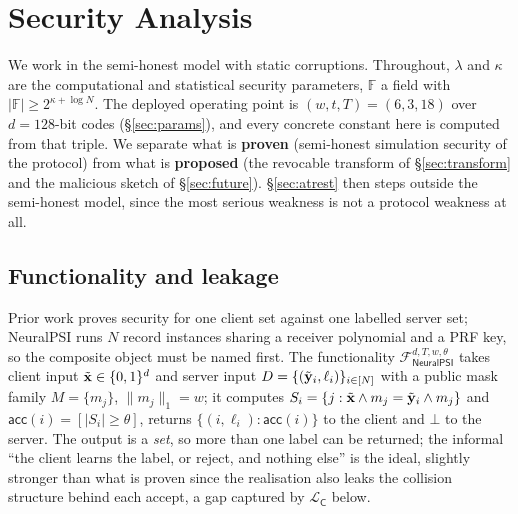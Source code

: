 \section{Security Analysis}
\label{sec:security}

We work in the semi-honest model with static corruptions. Throughout, $\lambda$ and $\kappa$ are the
computational and statistical security parameters, $\mathbb{F}$ a field with $|\mathbb{F}| \ge
2^{\kappa + \log N}$. The deployed operating point is $(w,t,T) = (6,3,18)$ over $d=128$-bit codes
(\S\ref{sec:params}), and every concrete constant here is computed from that triple. We separate what
is \textbf{proven} (semi-honest simulation security of the protocol) from what is \textbf{proposed}
(the revocable transform of \S\ref{sec:transform} and the malicious sketch of \S\ref{sec:future}).
\S\ref{sec:atrest} then steps outside the semi-honest model, since the most serious weakness is not a
protocol weakness at all.

\subsection{Functionality and leakage}
\label{sec:functionality}

Prior work proves security for one client set against one labelled server set; NeuralPSI runs $N$
record instances sharing a receiver polynomial and a PRF key, so the composite object must be named
first. The functionality $\mathcal{F}_{\mathsf{NeuralPSI}}^{d,T,w,\theta}$ takes client input
$\tilde{\mathbf{x}} \in \{0,1\}^d$ and server input $D=\{(\tilde{\mathbf{y}}_i,\ell_i)\}_{i\in[N]}$ with a public mask family
$M=\{m_j\}$, $\|m_j\|_1=w$; it computes $S_i = \{ j : \tilde{\mathbf{x}} \wedge m_j = \tilde{\mathbf{y}}_i \wedge m_j\}$ and
$\mathsf{acc}(i) = [|S_i| \ge \theta]$, returns $\{(i,\ell_i) : \mathsf{acc}(i)\}$ to the client and
$\bot$ to the server. The output is a \emph{set}, so more than one label can be returned; the informal
``the client learns the label, or reject, and nothing else'' is the ideal, slightly stronger than what
is proven since the realisation also leaks the collision structure behind each accept, a gap captured
by $\mathcal{L}_{\mathsf{C}}$ below.

